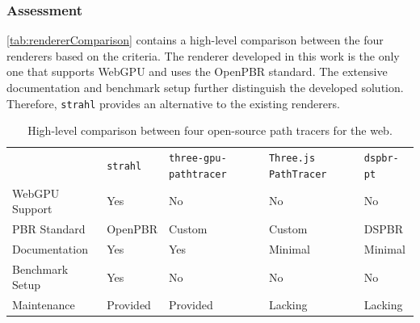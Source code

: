 \subsubsection*{Assessment}

\autoref{tab:rendererComparison} contains a high-level comparison between the four renderers based on the criteria. The renderer developed in this work is the only one that supports \gls{WebGPU} and uses the \gls{OpenPBR} standard. The extensive documentation and benchmark setup further distinguish the developed solution. Therefore, \texttt{strahl} provides an alternative to the existing renderers.

\begin{table}[H]
  \centering
  \begin{tabular}{@{}p{2.6cm}p{2.0cm}p{2.8cm}p{3.2cm}p{2.4cm}@{}}
    \toprule
                                  & \texttt{strahl} & \texttt{three-gpu-} \texttt{pathtracer} \cite{ThreeJsPathTracerJohnson} & \texttt{Three.js PathTracer} \cite{ThreeJsPathTracerLoftis} & \texttt{dspbr-pt} \cite{PathTracerDassault} \\
    \gls{WebGPU} \newline Support & Yes             & No                                                                      & No                                                          & No                                          \\
    \gls{PBR} Standard            & \gls{OpenPBR}   & Custom                                                                  & Custom                                                      & \gls{DSPBR}                                 \\
    Documentation                 & Yes             & Yes                                                                     & Minimal                                                     & Minimal                                     \\
    Benchmark \newline Setup      & Yes             & No                                                                      & No                                                          & No                                          \\
    Maintenance                   & Provided        & Provided                                                                & Lacking                                                     & Lacking                                     \\
    \bottomrule
  \end{tabular}
  \caption{High-level comparison between four open-source path tracers for the web.}
  \label{tab:rendererComparison}
\end{table}

